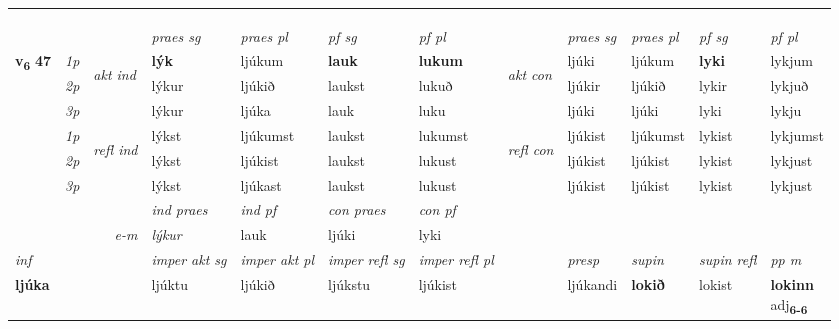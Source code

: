 \begin{longtable}[l]{X>{\footnotesize\itshape}llXXXXlXXXX}
\midrule
& \\*
   & \\*
  & \\
   \midrule
 & &   & \textit{praes sg}  & \textit{praes pl}    & \textit{ pf sg} & \textit{pf pl} & & \textit{praes sg}  & \textit{praes pl}    & \textit{pf sg} & \textit{pf pl }  \\ \cmidrule{4-7} \cmidrule{9-12}
 \multirow{2}{*}{{{\textbf{v{\textsubscript{6}}} \Large{\textbf{47}}}}}  & 1p & \multirow{3}{*}{\begin{turn}{90}\textit{akt ind}\end{turn}} & \textbf{lýk} & ljúkum & \textbf{lauk} & \textbf{lukum} & \multirow{3}{*}{\begin{turn}{90}\textit{akt con}\end{turn}} &ljúki & ljúkum & \textbf{lyki} & lykjum\\*
 & 2p &  &  lýkur  & ljúkið & laukst & lukuð & & ljúkir & ljúkið & lykir & lykjuð \\*
 & 3p &  & lýkur & ljúka & lauk & luku & & ljúki & ljúki& lyki & lykju \\*
\cmidrule{4-7} \cmidrule{9-12}
 & 1p & \multirow{3}{*}{\begin{turn}{90}\textit{refl ind}\end{turn}}  & lýkst & ljúkumst & laukst & lukumst & \multirow{3}{*}{\begin{turn}{90}\textit{refl con}\end{turn}}  &ljúkist & ljúkumst & lykist & lykjumst \\*
 & 2p &  & lýkst & ljúkist & laukst & lukust & &ljúkist & ljúkist & lykist & lykjust \\*
 & 3p  & & lýkst & ljúkast & laukst & lukust & & ljúkist & ljúkist& lykist & lykjust \\*
\cmidrule{4-7} \cmidrule{9-12}

   && &  \textit{ind praes} & \textit{ind pf} & \textit{con praes} & \textit{con pf} \\*
\multicolumn{3}{r}{\textit{e-m}} & lýkur & lauk & ljúki & lyki \\*

\cmidrule{4-7}
   {\textit{inf}} & &  & \textit{imper akt sg} & \textit{imper akt pl} & \textit{imper refl sg} & \textit{imper refl pl} && \textit{presp} & \textit{supin} & \textit{supin refl} & \textit{pp m} \\*
  {\textbf{ljúka}} & && ljúktu  & ljúkið & ljúkstu & ljúkist && ljúkandi &  \textbf{lokið} & lokist & \specialcell{\textbf{lokinn} \\ adj\textbf{\textsubscript{6-6}}} \\*


\end{longtable}
